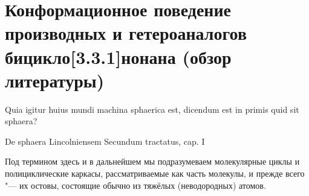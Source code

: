 \chapter{Конформационное поведение производных и гетероаналогов бицикло[3.3.1]нонана (обзор литературы)}

\epigraph{Quia igitur huius mundi machina sphaerica est, dicendum est in primis quid sit sphaera?}{De sphaera Lincolniensem Secundum tractatus, cap. I}

Под термином  здесь и в дальнейшем мы подразумеваем молекулярные циклы и полициклические каркасы, рассматриваемые как часть молекулы, и прежде всего "--- их остовы, состоящие обычно из тяжёлых (неводородных) атомов.

\begin{figure}
\end{figure}
